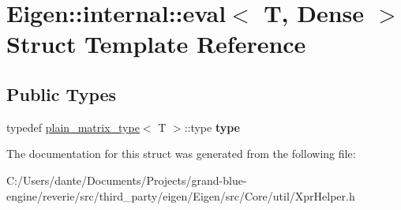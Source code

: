\hypertarget{struct_eigen_1_1internal_1_1eval_3_01_t_00_01_dense_01_4}{}\section{Eigen\+::internal\+::eval$<$ T, Dense $>$ Struct Template Reference}
\label{struct_eigen_1_1internal_1_1eval_3_01_t_00_01_dense_01_4}
\subsection*{Public Types}
\begin{DoxyCompactItemize}
\item 
\mbox{\label{struct_eigen_1_1internal_1_1eval_3_01_t_00_01_dense_01_4_a3a362b3b0d46ae32ce625c952737bc2c}} 
typedef \mbox{\hyperlink{struct_eigen_1_1internal_1_1plain__matrix__type}{plain\+\_\+matrix\+\_\+type}}$<$ T $>$\+::type {\bfseries type}
\end{DoxyCompactItemize}


The documentation for this struct was generated from the following file\+:\begin{DoxyCompactItemize}
\item 
C\+:/\+Users/dante/\+Documents/\+Projects/grand-\/blue-\/engine/reverie/src/third\+\_\+party/eigen/\+Eigen/src/\+Core/util/Xpr\+Helper.\+h\end{DoxyCompactItemize}
